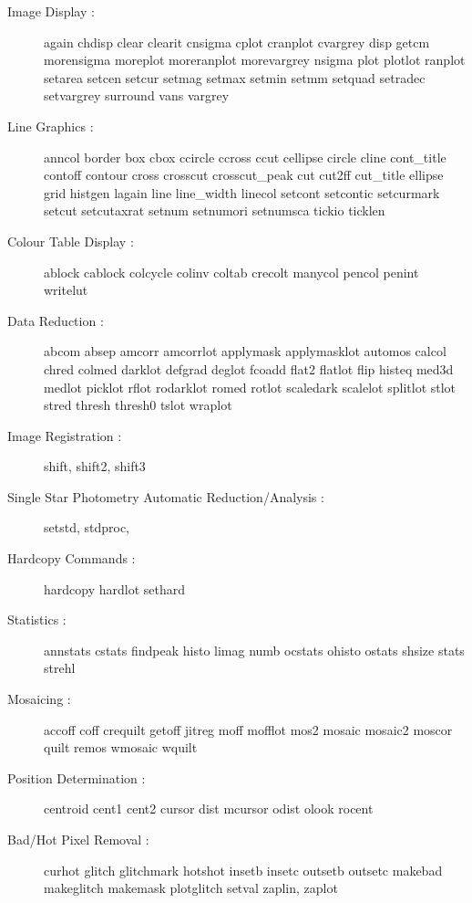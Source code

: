 \begin{description}


\item[Image Display :] again chdisp clear clearit cnsigma cplot cranplot
cvargrey disp getcm morensigma moreplot moreranplot morevargrey nsigma
plot plotlot ranplot setarea setcen setcur setmag setmax setmin setmm
setquad setradec setvargrey surround vans vargrey

\item[Line Graphics :] anncol border box cbox ccircle ccross ccut cellipse
circle cline cont\_title contoff contour cross crosscut crosscut\_peak cut
cut2ff cut\_title ellipse grid histgen lagain line line\_width linecol
setcont setcontic setcurmark setcut setcutaxrat setnum setnumori
setnumsca tickio ticklen

\item[Colour Table Display :] ablock cablock colcycle colinv coltab crecolt
manycol pencol penint writelut

\item[Data Reduction :] abcom absep amcorr amcorrlot applymask applymasklot
automos calcol chred colmed darklot defgrad deglot fcoadd flat2 flatlot
flip histeq med3d medlot picklot rflot rodarklot romed rotlot scaledark
scalelot splitlot stlot stred thresh thresh0 tslot wraplot 

\item[Image Registration :] shift, shift2, shift3

\item[Single Star Photometry Automatic Reduction/Analysis :] setstd, stdproc,

\item[Hardcopy Commands :] hardcopy hardlot sethard

\item[Statistics :] annstats cstats findpeak histo limag numb ocstats ohisto
ostats shsize stats strehl

\item[Mosaicing :] accoff coff crequilt getoff jitreg moff mofflot mos2 mosaic
mosaic2 moscor quilt remos wmosaic wquilt

\item[Position Determination :] centroid cent1 cent2 cursor dist mcursor odist
olook rocent

\item[Bad/Hot Pixel Removal :] curhot glitch glitchmark hotshot insetb insetc
outsetb outsetc makebad makeglitch makemask plotglitch setval zaplin,
zaplot


\end{description}
